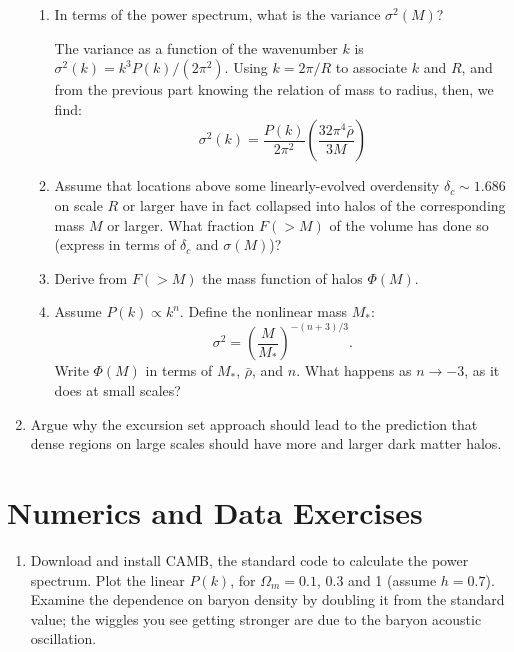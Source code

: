 \begin{enumerate}
\begin{enumerate}
\item In terms of the power spectrum, what is the variance
$\sigma^2(M)$?
\begin{answer}
The variance as a function of the wavenumber $k$ is
$\sigma^2(k)=k^3 P(k)/(2\pi^2)$. Using $k=2\pi/R$ to associate $k$ and
$R$, and from the previous part knowing the relation of mass to radius,
then, we find:
\begin{equation}
    \sigma^2(k) = \frac{P(k)}{2\pi^2}
    \left(\frac{32\pi^4\bar{\rho}}{3M}\right)
\end{equation}
\end{answer}
\item Assume that locations above some linearly-evolved
overdensity $\delta_c \sim 1.686$ on scale $R$ or larger have in fact
collapsed into halos of the corresponding mass $M$ or larger. What
fraction $F(>M)$ of the volume has done so (express in terms of $\delta_c$ and
$\sigma(M)$)?
\item Derive from $F(>M)$ the mass function of halos $\Phi(M)$. 
\item Assume $P(k)\propto k^n$. Define the nonlinear mass $M_\ast$:
\begin{equation}
\sigma^2 = \left(\frac{M}{M_\ast}\right)^{-(n+3)/3}.
\end{equation}
Write $\Phi(M)$  in terms of $M_\ast$, $\bar\rho$, and $n$. What
happens as $n\rightarrow -3$, as it does at small scales?
\end{enumerate}
\item Argue why the excursion set approach should lead to the
prediction that dense regions on large scales should have more and
larger dark matter halos.
\end{enumerate}

\section{Numerics and Data Exercises}

\begin{enumerate}
\item Download and install CAMB, the standard code to calculate the
power spectrum. Plot the linear $P(k)$, for $\Omega_m= 0.1$, $0.3$ and
1 (assume $h=0.7$). Examine the dependence on baryon density by
doubling it from the standard value; the wiggles you see getting
stronger are due to the baryon acoustic oscillation.
\end{enumerate}


  

